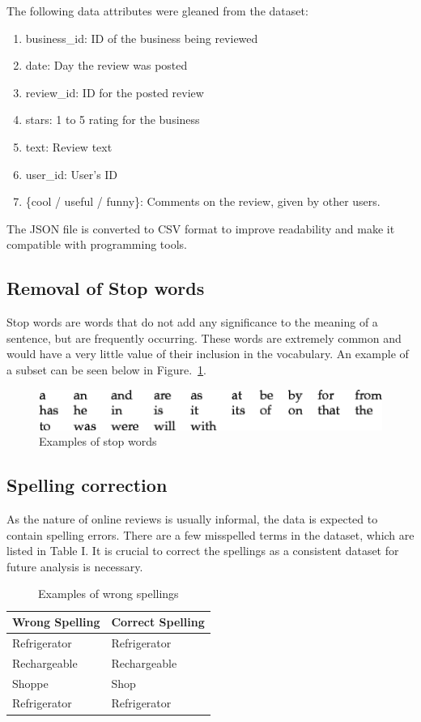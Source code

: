 \documentclass[letterpaper, 10 pt, conference]{ieeeconf}  %
\begin{document}
The following data attributes were gleaned from the dataset:
\begin{enumerate}
    \item business\_id: ID of the business being reviewed
    \item date: Day the review was posted
    \item review\_id: ID for the posted review
    \item stars: 1 to 5 rating for the business
    \item text: Review text
    \item user\_id: User’s ID
    \item \{cool / useful / funny\}: Comments on the review, given by other users.\\
\end{enumerate}
The JSON file is converted to CSV format to 
improve readability and make it compatible with programming tools. 


\subsection{Removal of Stop words}

Stop words are words that do not add any significance to the meaning of a sentence, but are frequently occurring. These words are extremely common and would have a very little value of their inclusion in the vocabulary. An example of a subset can be seen below in  Figure.~\ref{fig:8}.
\begin{figure}[htb]
\includegraphics[width = \linewidth]{images/image8.png}
\caption{Examples of stop words}
\label{fig:8}
\end{figure}

\subsection{Spelling correction}

As the nature of online reviews is usually informal, the data is expected to contain spelling errors.
There are a few misspelled terms in the dataset, which are listed in Table I. It is crucial to correct the spellings as a consistent dataset for future analysis is necessary.

\begin{table}
\centering
\caption{Examples of wrong spellings}\label{tab1}
\begin{tabular}{|l|l|}
\hline
\textbf{Wrong Spelling} & \textbf{Correct Spelling} \\
\hline
Refrigerator & Refrigerator\\
\hline
Rechargeable & Rechargeable\\
\hline
Shoppe & Shop\\
\hline
Refrigerator & Refrigerator\\
\hline
\end{tabular}
\end{table}
\end{document}
